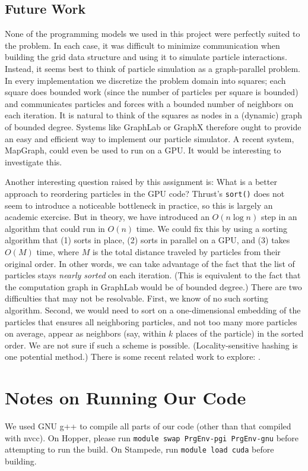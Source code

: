 \documentclass{article}
\newcommand{\code}[1]%
  {\texttt{#1}}
\begin{document}
\subsection{Future Work}
\label{sec:future}
None of the programming models we used in this project were perfectly suited to the problem.  In each case, it was difficult to minimize communication when building the grid data structure and using it to simulate particle interactions.  Instead, it seems best to think of particle simulation as a graph-parallel problem.  In every implementation we discretize the problem domain into squares; each square does bounded work (since the number of particles per square is bounded) and communicates particles and forces with a bounded number of neighbors on each iteration.  It is natural to think of the squares as nodes in a (dynamic) graph of bounded degree.  Systems like GraphLab \cite{graphlab} or GraphX \cite{graphx} therefore ought to provide an easy and efficient way to implement our particle simulator.  A recent system, MapGraph, could even be used to run on a GPU.  It would be interesting to investigate this.

Another interesting question raised by this assignment is: What is a better approach to reordering particles in the GPU code?  Thrust's \code{sort()} does not seem to introduce a noticeable bottleneck in practice, so this is largely an academic exercise.  But in theory, we have introduced an $O(n \log n)$ step in an algorithm that could run in $O(n)$ time.  We could fix this by using a sorting algorithm that (1) sorts in place, (2) sorts in parallel on a GPU, and (3) takes $O(M)$ time, where $M$ is the total distance traveled by particles from their original order.  In other words, we can take advantage of the fact that the list of particles stays \emph{nearly sorted} on each iteration.  (This is equivalent to the fact that the computation graph in GraphLab would be of bounded degree.)  There are two difficulties that may not be resolvable.  First, we know of no such sorting algorithm.  Second, we would need to sort on a one-dimensional embedding of the particles that ensures all neighboring particles, and not too many more particles on average, appear as neighbors (say, within $k$ places of the particle) in the sorted order.  We are not sure if such a scheme is possible.  (Locality-sensitive hashing is one potential method.)  There is some recent related work to explore: \cite{durand2012packed}.

\section{Notes on Running Our Code}
We used GNU g++ to compile all parts of our code (other than that compiled with nvcc).  On Hopper, please run \code{module swap PrgEnv-pgi PrgEnv-gnu} before attempting to run the build.  On Stampede, run \code{module load cuda} before building.



\end{document}
